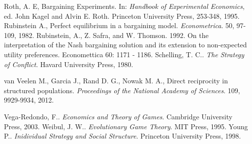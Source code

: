 \documentclass[12.5pt]{report}
\begin{document}
\begin{thebibliography}{}
 Roth, A. E, Bargaining Experiments. In: {\emph{Handbook of Experimental Economics}}, ed. John Kagel and Alvin E. Roth. Princeton University Press, 253-348, 1995. 
 Rubinstein A., Perfect equilibrium in a bargaining model. {\emph{Econometrica}}. 50, 97-109, 1982. 
 Rubinstein, A., Z. Safra, and W. Thomson. 1992. On the interpretation of the Nash bargaining solution and its extension to non-expected utility preferences.
Economettica 60: 1171 - 1186.
 Schelling, T. C.. {\emph{The Strategy of Conflict}}. Havard University Press, 1980. 

 van Veelen M., Garcia J., Rand D. G., Nowak M. A., Direct reciprocity in structured populations. {\emph{Proceedings of the National Academy of Sciences}}. 109, 9929-9934, 2012. 

 Vega-Redondo, F.. {\emph{Economics and Theory of Games}}. Cambridge University Press, 2003. 
 Weibul, J. W.. {\emph{Evolutionary Game Theory}}. MIT Press, 1995. 
 Young P.. {\emph{Inidividual Strategy and Social Structure}}. Princeton University Press, 1998.






\end{thebibliography}
\end{document}
